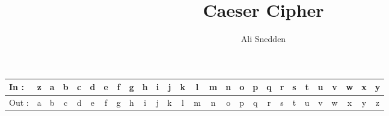 \documentclass{article}
\begin{document}
\title{Caeser Cipher}
\author{Ali Snedden}

\small
{} %
\begin{landscape}
\begin{adjustbox}{left}
\begin{tabularx}{1.33\textwidth}{|l|c|c|c|c|c|c|c|c|c|c|c|c|c|c|c|c|c|c|c|c|c|c|c|c|c|c|}
  \hline
    In : & z & a & b & c & d & e & f & g & h & i & j & k & l & m & n & o & p & q & r & s & t & u & v & w & x & y \\
  \hline
    Out : & a & b & c & d & e & f & g & h & i & j & k & l & m & n & o & p & q & r & s & t & u & v & w & x & y & z \\
  \hline
\end{tabularx}
\end{adjustbox}
\end{landscape}
\restoregeometry
\end{document}
